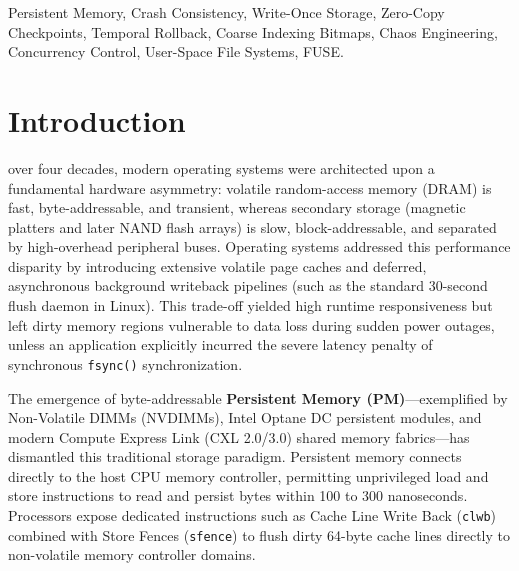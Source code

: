 \documentclass[conference]{IEEEtran}
\begin{document}
\begin{abstract}
Extensive experimental evaluations demonstrate that WOLVES maintains strictly flat $O(1)$ snapshot creation latency ($<0.82~\mu\text{s}$) across 100,000 files, finishes crash recovery in under $0.43~\text{ms}$ on 128~GB persistent pools, scales concurrent read throughput to 940~Kops/sec across 16 execution threads, and provides robust resilience against cryptographic ransomware attacks.
\end{abstract}

\begin{IEEEkeywords}
Persistent Memory, Crash Consistency, Write-Once Storage, Zero-Copy Checkpoints, Temporal Rollback, Coarse Indexing Bitmaps, Chaos Engineering, Concurrency Control, User-Space File Systems, FUSE.
\end{IEEEkeywords}

\section{Introduction}

 over four decades, modern operating systems were architected upon a fundamental hardware asymmetry: volatile random-access memory (DRAM) is fast, byte-addressable, and transient, whereas secondary storage (magnetic platters and later NAND flash arrays) is slow, block-addressable, and separated by high-overhead peripheral buses. Operating systems addressed this performance disparity by introducing extensive volatile page caches and deferred, asynchronous background writeback pipelines (such as the standard 30-second flush daemon in Linux). This trade-off yielded high runtime responsiveness but left dirty memory regions vulnerable to data loss during sudden power outages, unless an application explicitly incurred the severe latency penalty of synchronous \texttt{fsync()} synchronization.

The emergence of byte-addressable \textbf{Persistent Memory (PM)}---exemplified by Non-Volatile DIMMs (NVDIMMs), Intel Optane DC persistent modules, and modern Compute Express Link (CXL 2.0/3.0) shared memory fabrics---has dismantled this traditional storage paradigm. Persistent memory connects directly to the host CPU memory controller, permitting unprivileged load and store instructions to read and persist bytes within 100 to 300 nanoseconds. Processors expose dedicated instructions such as Cache Line Write Back (\texttt{clwb}) combined with Store Fences (\texttt{sfence}) to flush dirty 64-byte cache lines directly to non-volatile memory controller domains.
\end{document}
